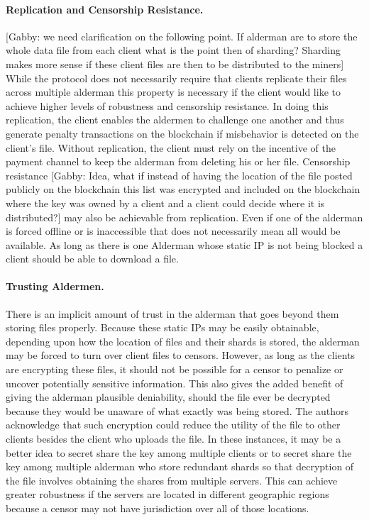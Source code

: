 \documentclass{article}
\begin{document}
\paragraph{Replication and Censorship Resistance.}
[Gabby: we need clarification on the following point. If alderman are to store the whole data file from each client what is the point then of sharding? Sharding makes more sense if these client files are then to be distributed to the miners]
While the protocol does not necessarily require that clients replicate their files across multiple alderman this property is necessary if the client would like to achieve higher levels of robustness and censorship resistance. In doing this replication, the client enables the aldermen to challenge one another and thus generate penalty transactions on the blockchain if misbehavior is detected on the client's file. Without replication, the client must rely on the incentive of the payment channel to keep the alderman from deleting his or her file. Censorship resistance [Gabby: Idea, what if instead of having the location of the file posted publicly on the blockchain this list was encrypted and included on the blockchain where the key was owned by a client and a client could decide where it is distributed?] may also be achievable from replication. Even if one of the alderman is forced offline or is inaccessible that does not necessarily mean all would be available. As long as there is one Alderman whose static IP is not being blocked a client should be able to download a file. 

\paragraph{Trusting Aldermen.} 
There is an implicit amount of trust in the alderman that goes beyond them storing files properly. Because these static IPs may be easily obtainable, depending upon how the location of files and their shards is stored, the alderman may be forced to turn over client files to censors. However, as long as the clients are encrypting these files, it should not be possible for a censor to penalize or uncover potentially sensitive information. This also gives the added benefit of giving the alderman plausible deniability, should the file ever be decrypted because they would be unaware of what exactly was being stored. The authors acknowledge that such encryption could reduce the utility of the file to other clients besides the client who uploads the file. In these instances, it may be a better idea to secret share the key among multiple clients or to secret share the key among multiple alderman who store redundant shards so that decryption of the file involves obtaining the shares from multiple servers. This can achieve greater robustness if the servers are located in different geographic regions because a censor may not have jurisdiction over all of those locations. 
\end{document}
